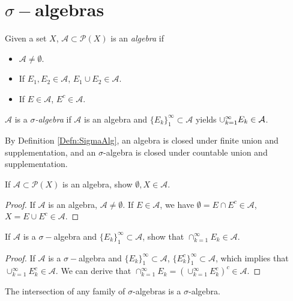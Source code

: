 \section{$\sigma-$algebras}
\begin{defn}
    \label{Defn:SigmaAlg}
    Given a set $X$, $\mathcal{A}\subset\mathcal{P}(X)$ 
    is an \textit{algebra} if 
    \begin{itemize}
        \item $\mathcal{A}\neq\emptyset$.
        \item If $E_1,E_2\in\mathcal{A}$, $E_1\cup E_2\in\mathcal{A}$.
        \item If $E\in\mathcal{A}$, $E^{c}\in\mathcal{A}$.
    \end{itemize}
    $\mathcal{A}$ is a \textit{$\sigma$-algebra} if 
    $\mathcal{A}$ is an algebra and 
    $\{E_{k}\}_1^{\infty}\subset\mathcal{A}$ yields 
    $\cup_{k=1}^{\infty}E_k\in\mathcal{A}$.
\end{defn}
\begin{rem}
    By Definition \ref{Defn:SigmaAlg}, an algebra is closed 
    under finite union and supplementation, 
    and an $\sigma$-algebra is closed under 
    countable union and supplementation.
\end{rem}
\begin{exc}
    If $\mathcal{A}\subset\mathcal{P}(X)$ is an algebra, 
    show $\emptyset,X\in\mathcal{A}$.
\end{exc}
\begin{proof}
    If $\mathcal{A}$ is an algebra, $\mathcal{A}\neq\emptyset$. 
    If $E\in\mathcal{A}$, we have $\emptyset=E\cap E^c\in\mathcal{A}$, 
    $X=E\cup E^c\in\mathcal{A}$.
\end{proof}
\begin{exc}
    If $\mathcal{A}$ is a $\sigma-$algebra and 
    $\{E_{k}\}_{1}^{\infty}\subset\mathcal{A}$, show that 
    $\cap_{k=1}^{\infty}E_{k}\in\mathcal{A}$.
\end{exc}
\begin{proof}
    If $\mathcal{A}$ is a $\sigma-$algebra and 
    $\{E_{k}\}_{1}^{\infty}\subset\mathcal{A}$, 
    $\{E_{k}^c\}_{1}^{\infty}\subset\mathcal{A}$,
    which implies that $\cup_{k=1}^{\infty}E_{k}^c\in\mathcal{A}$.
    We can derive that $\cap_{k=1}^{\infty}E_{k}=(\cup_{k=1}^{\infty}E_{k}^c)^c\in\mathcal{A}$.
\end{proof}
\begin{lem}
    \label{Lem:IntersecOfSigmaAlg}
    The intersection of any family of $\sigma$-algebras is a 
    $\sigma$-algebra.
\end{lem}
